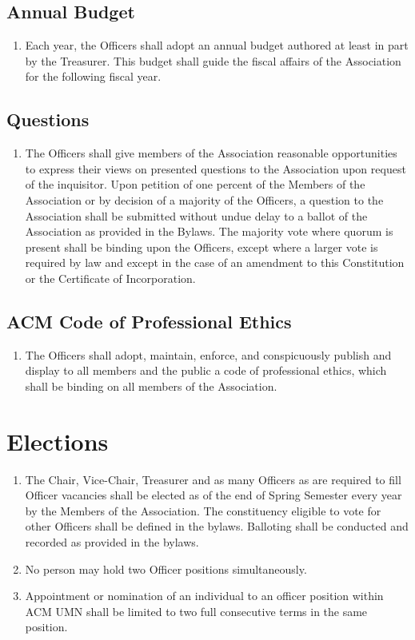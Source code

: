 \subsection{Annual Budget}
\begin{enumerate}
	\item Each year, the Officers shall adopt an annual budget authored at least in part by the Treasurer. This budget shall guide the fiscal affairs of the Association for the following fiscal year.
\end{enumerate}

\subsection{Questions}
\begin{enumerate}
	\item The Officers shall give members of the Association reasonable opportunities to express their views on presented questions to the Association upon request of the inquisitor. Upon petition of one percent of the Members of the Association or by decision of a majority of the Officers, a question to the Association shall be submitted without undue delay to a ballot of the Association as provided in the Bylaws. The majority vote where quorum is present shall be binding upon the Officers, except where a larger vote is required by law and except in the case of an amendment to this Constitution or the Certificate of Incorporation.
\end{enumerate}

\subsection{ACM Code of Professional Ethics}
\begin{enumerate}
	\item The Officers shall adopt, maintain, enforce, and conspicuously publish and display to all members and the public a code of professional ethics, which shall be binding on all members of the Association.
\end{enumerate}

\section{Elections}
\begin{enumerate}
	\item The Chair, Vice-Chair, Treasurer and as many Officers as are required to fill Officer vacancies shall be elected as of the end of Spring Semester every year by the Members of the Association. The constituency eligible to vote for other Officers shall be defined in the bylaws. Balloting shall be conducted and recorded as provided in the bylaws.
	\item No person may hold two Officer positions simultaneously.
	\item Appointment or nomination of an individual to an officer position within ACM UMN shall be limited to two full consecutive terms in the same position.
\end{enumerate}

